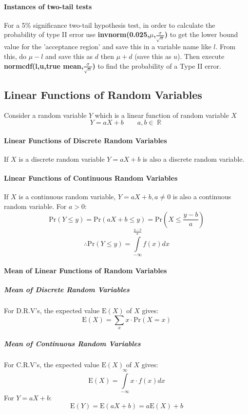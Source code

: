 \documentclass[a4paper,twoside]{article}
\DeclareMathOperator\R{\mathbb{R}}
\begin{document}
				\paragraph{Instances of two-tail tests} For a 5\% significance two-tail hypothesis test, in order to calculate the probability of type II error use \textbf{invnorm(0.025,$\mu$,$\frac{\sigma}{\sqrt{n}}$)} to get the lower bound value for the 'acceptance region' and save this in a variable name like $l$. From this, do $\mu-l$ and save this as $d$ then $\mu+d$ (save this as $u$). Then execute \textbf{normcdf(l,u,true mean,$\frac{\sigma}{\sqrt{n}}$)} to find the probability of a Type II error.
		\subsection{Linear Functions of Random Variables}
			Consider a random variable $Y$ which is a linear function of random variable $X$
			\[
				Y=aX+b\qquad a,b\in\R
			\]
			
			\paragraph{Linear Functions of Discrete Random Variables} If $X$ is a discrete random variable $Y=aX+b$ is also a discrete random variable.
			
			\paragraph{Linear Functions of Continuous Random Variables} If $X$ is a continuous random variable, $Y=aX+b,a\neq0$ is also a continuous random variable. For $a>0$:
			\[
				\mathrm{Pr}(Y\leq y)=\mathrm{Pr}(aX+b\leq y)=\mathrm{Pr}\left(X\leq\frac{y-b}{a}\right)
			\]
			\[
				\therefore \mathrm{Pr}(Y\leq y)=\int\limits_{-\infty}^{\frac{y-b}{a}}f(x)dx
			\]
			
			\paragraph{Mean of Linear Functions of Random Variables}
				\subparagraph{Mean of Discrete Random Variables} For D.R.V's, the expected value $\mathrm{E}(X)$ of $X$ gives:
					\[
					\mathrm{E}(X)=\sum\limits_xx\cdot\mathrm{Pr}(X=x)
					\]
				\subparagraph{Mean of Continuous Random Variables} For C.R.V's, the expected value $\mathrm{E}(X)$ of $X$ gives:
					\[
					\mathrm{E}(X)=\int\limits_{-\infty}^{\infty}x\cdot f(x)dx
					\]
				For $Y=aX+b$:
				\[
					\mathrm{E}(Y)=\mathrm{E}(aX+b)=a\mathrm{E}(X)+b
				\]
			
\end{document}

